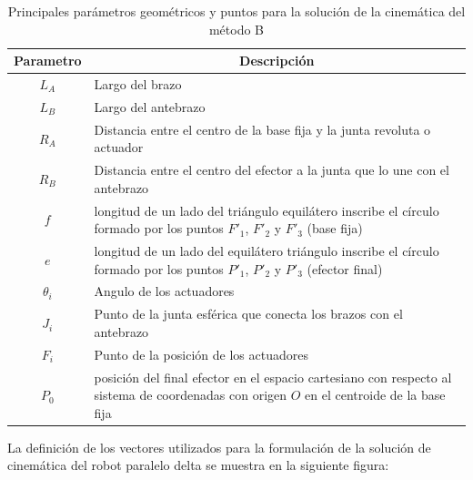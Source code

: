         \begingroup
            \renewcommand{\arraystretch}{1.3}
            \begin{table}[H]
            \centering
            \begin{tabular}{c m{12cm}}
               \hline
               \textbf{Parametro}  & \multicolumn{1}{c}{\textbf{Descripción}}  \\
               \hline           \hline            
             $L_A$ & Largo del brazo \\
            \hline
             $L_B$ & Largo del antebrazo \\
            \hline
             $R_A$ & Distancia entre el centro de la base fija y la junta revoluta o actuador \\
            \hline
             $R_B$ & Distancia entre el centro del efector a la junta que lo une con el antebrazo\\
            \hline
             $f$ & longitud de un lado del triángulo equilátero inscribe el círculo formado por los puntos $F'_1$, $F'_2$ y $F'_3$ (base fija)\\
            \hline
             $e$ & longitud de un lado del equilátero triángulo inscribe el círculo formado por los puntos $P'_1$, $P'_2$ y $P'_3$ (efector final)\\
            \hline
             $\theta_i$ & Angulo de los actuadores\\
            \hline
             $J_i$ & Punto de la junta esférica que conecta los brazos con el antebrazo\\
            \hline            
             $F_i$ & Punto de la posición de los actuadores\\
            \hline  
             $P_0$ & posición del final efector en el espacio cartesiano con respecto al sistema de coordenadas con origen $O$ en el centroide de la base fija\\
            \hline            
            \end{tabular}
            \caption{Principales parámetros geométricos y puntos para la solución de la cinemática del método B}
           \label{tab:cap4_tabla_12}
        \end{table}
        \endgroup     
        
        
        \newpage
    
        La definición de los vectores utilizados para la formulación de la solución de cinemática del robot paralelo delta se muestra en la siguiente figura: 
    
